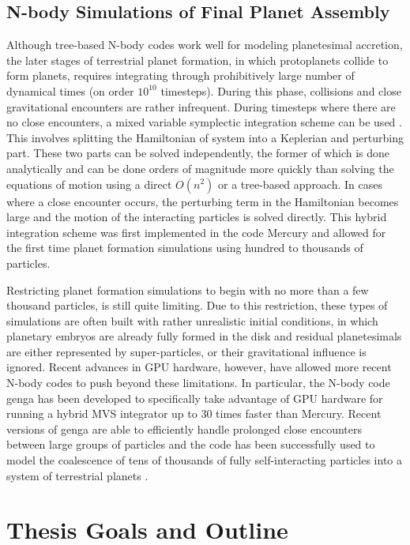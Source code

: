 \subsection{N-body Simulations of Final Planet Assembly}

Although tree-based N-body codes work well for modeling planetesimal accretion, the later stages of terrestrial planet formation, in which protoplanets collide to form planets, requires integrating through prohibitively large number of dynamical times (on order $10^{10}$ timesteps). During this phase, collisions and close gravitational encounters are rather infrequent. During timesteps where there are no close encounters, a mixed variable symplectic integration scheme can be used \cite{wisdom91}. This involves splitting the Hamiltonian of system into a Keplerian and perturbing part. These two parts can be solved independently, the former of which is done analytically and can be done orders of magnitude more quickly than solving the equations of motion using a direct $O(n^{2})$ or a tree-based approach. In cases where a close encounter occurs, the perturbing term in the Hamiltonian becomes large and the motion of the interacting particles is solved directly. This hybrid integration scheme was first implemented in the code {\sc Mercury} \cite{chambers99} and allowed for the first time planet formation simulations using hundred to thousands of particles.

 Restricting planet formation simulations to begin with no more than a few thousand particles, is still quite limiting. Due to this restriction, these types of simulations are often built with rather unrealistic initial conditions, in which planetary embryos are already fully formed in the disk and residual planetesimals are either represented by super-particles, or their gravitational influence is ignored. Recent advances in GPU hardware, however, have allowed more recent N-body codes to push beyond these limitations. In particular, the N-body code {\sc genga} \cite{grimm14, grimm22} has been developed to specifically take advantage of GPU hardware for running a hybrid MVS integrator up to 30 times faster than {\sc Mercury}. Recent versions of genga are able to efficiently handle prolonged close encounters between large groups of particles and the code has been successfully used to model the coalescence of tens of thousands of fully self-interacting particles into a system of terrestrial planets \cite{woo21}.

\section{Thesis Goals and Outline}

